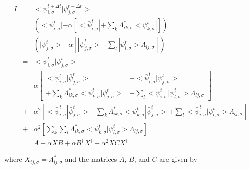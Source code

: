 \begin{eqnarray}
I &=& <\psi_{i,\sigma}^{t+\Delta t} | \psi_{j,\sigma}^{t+\Delta t}> \nonumber \\
  &=& 
   \left( <\psi_{i,\sigma}^{t}| 
          - \alpha  
            \left[
                  <\bar{\psi}_{i,\sigma}^{t}| 
                  + \sum_{k} \Lambda_{ik,\sigma}^{*} <\psi_{k,\sigma}^{t}|
            \right]
   \right) \nonumber \\
& & 
   \left( |\psi_{j,\sigma}^{t}> 
          - \alpha  
            \left[
                  |\bar{\psi}_{j,\sigma}^{t}> 
                  + \sum_{l} |\psi_{l,\sigma}^{t}> \Lambda_{lj,\sigma} 
            \right]
   \right) \nonumber \\
  &=& <\psi_{i,\sigma}^{t}| \psi_{j,\sigma}^{t}> \nonumber \\
  &-& \alpha 
       \left[ 
         \begin{array}{ll}
           <\psi_{i,\sigma}^{t}| \bar{\psi}_{j,\sigma}^{t}> &
         + <\bar{\psi}_{i,\sigma}^{t}| \psi_{j,\sigma}^{t}> \\
         + \sum_{k} \Lambda_{ik,\sigma}^{*} 
                     <\psi_{k,\sigma}^{t}| \psi_{j,\sigma}^{t}> &
         + \sum_{l} <\psi_{i,\sigma}^{t}| \psi_{l,\sigma}^{t}>
                    \Lambda_{lj,\sigma} 
        \end{array}
       \right] \nonumber \\
  &+& \alpha^2 
       \left[
               <\bar{\psi}_{i,\sigma}^{t}| \bar{\psi}_{j,\sigma}^{t}> 
            + \sum_{k} \Lambda_{ik,\sigma}^{*} 
                    <\psi_{k,\sigma}^{t}| \bar{\psi}_{j,\sigma}^{t}> 
            + \sum_{l} <\bar{\psi}_{i,\sigma}^{t}| \psi_{l,\sigma}^{t}>
                         \Lambda_{lj,\sigma} 
       \right]     \nonumber \\
  &+& \alpha^2 
       \left[
                \sum_{k} \sum_{l}
                 \Lambda_{ik,\sigma}^{*} 
                 <\psi_{k,\sigma}^{t}|\psi_{l,\sigma}^{t}>
                 \Lambda_{lj,\sigma} 
       \right] \nonumber \\
  &=& A + \alpha XB + \alpha B^{\dag}X^{\dag} + \alpha^2 XCX^{\dag} 
\label{eq:sd4}
\end{eqnarray}

\noindent
where $X_{ij,\sigma}=\Lambda_{ij,\sigma}^{*}$ and the matrices 
$A$, $B$, and $C$ are given by

